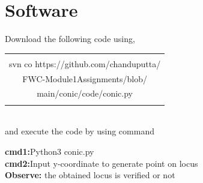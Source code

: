 \documentclass[journal,10pt,twocolumn]{article}
\begin{document}
\raggedright \section{Software}
Download the following code using,
\begin{table}[h]
    \centering
    \begin{tabular}{|c|}
    \hline \\
         svn co https://github.com/chanduputta/\\FWC-Module1Assignments/blob/\\main/conic/code/conic.py \\
         \\
\hline
    \end{tabular}
\end{table}
\\
and execute the code by using command
\begin{center}
\textbf{cmd1:}Python3  conic.py\\
\textbf{cmd2:}Input y-coordinate to generate point on locus\\
\textbf{Observe:} the obtained locus is verified or not\\
\end{center}
\end{document}
